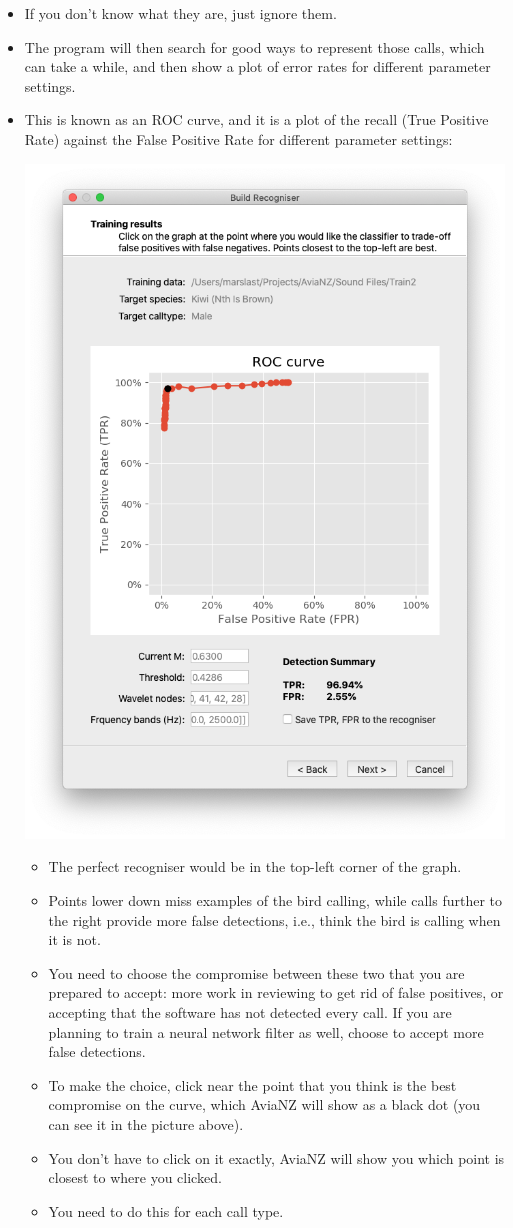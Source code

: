 \documentclass{article}
\begin{document}
\begin{itemize}
\item If you don't know what they are, just ignore them. 
\item The program will then search for good ways to represent those calls, which can take a while, and then show a plot of error rates for different parameter settings. 
\item This is known as an ROC curve, and it is a plot of the recall (True Positive Rate) against the False Positive Rate for different parameter settings:
\begin{center}
    \includegraphics[width=.7\textwidth]{Figures/BuildRecogniser4a}
\end{center}

\begin{itemize}
\item The perfect recogniser would be in the top-left corner of the graph. 
\item Points lower down miss examples of the bird calling, while calls further to the right provide more false detections, i.e., think the bird is calling when it is not. 
\item You need to choose the compromise between these two that you are prepared to accept: more work in reviewing to get rid of false positives, or accepting that the software has not detected every call. If you are planning to train a neural network filter as well, choose to accept more false detections.
\item To make the choice, click near the point that you think is the best compromise on the curve, which AviaNZ will show as a black dot (you can see it in the picture above). 
\item You don't have to click on it exactly, AviaNZ will show you which point is closest to where you clicked. 
\item You need to do this for each call type. 
\end{itemize}


\end{itemize}
\end{document}
